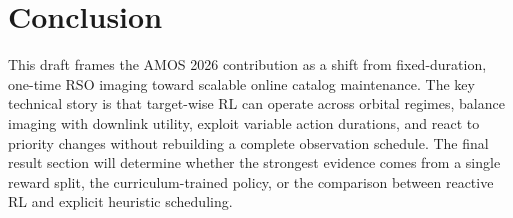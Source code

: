 \documentclass{amos}
\begin{document}
\section{Conclusion}

This draft frames the AMOS 2026 contribution as a shift from fixed-duration, one-time RSO imaging toward scalable online catalog maintenance. The key technical story is that target-wise RL can operate across orbital regimes, balance imaging with downlink utility, exploit variable action durations, and react to priority changes without rebuilding a complete observation schedule. The final result section will determine whether the strongest evidence comes from a single reward split, the curriculum-trained policy, or the comparison between reactive RL and explicit heuristic scheduling.



\begingroup
\renewcommand{\section}[2]{}%

\endgroup
\end{document}

